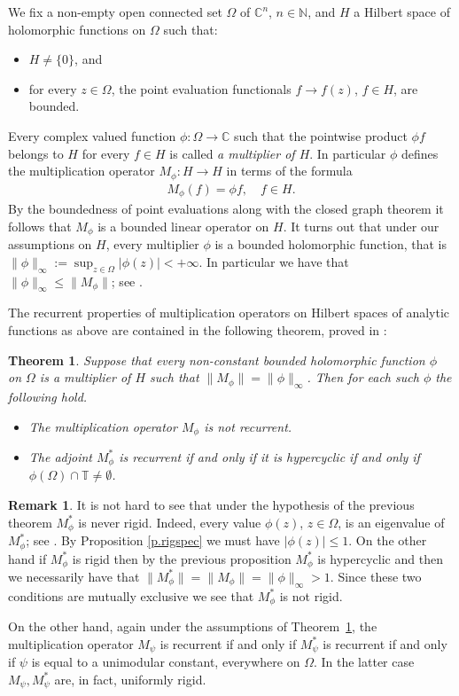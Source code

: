 \documentclass[12pt,leqno]{amsart}
\theoremstyle{plain}
\newtheorem{theorem}[equation]{Theorem}
\theoremstyle{definition}
\newtheorem{remark}[equation]{Remark}
\numberwithin{equation}{section}
\begin{document}
We fix a non-empty open connected set $\Omega$ of $\mathbb{C}^n$, $n\in \mathbb{N}$, and $H$ a Hilbert space of holomorphic functions on $\Omega $ such that: 
\begin{itemize}
	\item[-] $H\neq \{ 0\}$, and 
	\item [-]for every $z\in \Omega$, the point evaluation functionals $f\to f(z)$, $f\in H$, are bounded. 
\end{itemize}
Every complex valued function $\phi:\Omega \to \mathbb{C}$ such that the pointwise product $\phi f$ belongs to $H$ for every $f\in H$ is called \emph{a multiplier of $H$}. In particular $\phi$ defines the multiplication operator $M_{\phi}:H\to H$ in terms of the formula 
\begin{align*}
	M_{\phi }(f)=\phi f,\quad f\in H. 
\end{align*}
By the boundedness of point evaluations along with the closed graph theorem it follows that $M_{\phi}$ is a bounded linear operator on $H$. It turns out that under our assumptions on $H$, every multiplier $\phi $ is a bounded holomorphic function, that is $\| \phi \|_{\infty}:=\sup_{z\in \Omega }|\phi (z)|<+\infty $. In particular we have that $\| \phi \|_{\infty }\leq \| M_{\phi}\| $; see \cite{GoSh}.

The recurrent properties of multiplication operators on Hilbert spaces of analytic functions as above are contained in the following theorem, proved in \cite{CP}: 

\begin{theorem}\label{t.adjoints}
	Suppose that every non-constant bounded holomorphic function $\phi $ on $\Omega $ is a multiplier of $H$ such that $\| M_{\phi}\| =\| \phi \|_{\infty }$. Then for each such $\phi$ the following hold. 
	\begin{itemize}
		\item [(i)] The multiplication operator $M_\phi$ is not recurrent. 
		\item [(ii)] The adjoint $M_\phi ^*$ is recurrent if and only if it is hypercyclic if and only if $\phi(\Omega)\cap \mathbb T \neq \emptyset$. 
	\end{itemize}
\end{theorem}

\begin{remark} It is not hard to see that under the hypothesis of the previous theorem $M_\phi ^*$ is never rigid. Indeed, every value $\phi(z)$, $z\in \Omega$, is an eigenvalue of $M_\phi ^*$; see \cite{GoSh}. By Proposition \ref{p.rigspec} we must have $|\phi(z)|\leq 1$. On the other hand if $M_\phi ^*$ is rigid then by the previous proposition $M_\phi ^*$ is hypercyclic and then we necessarily have that $\|M_\phi ^*\|=\|M_\phi\|=\|\phi\|_\infty>1$. Since these two conditions are mutually exclusive we see that $M_\phi ^*$ is not rigid.

On the other hand, again under the assumptions of Theorem~\ref{t.adjoints}, the multiplication operator $M_{\psi }$ is recurrent if and only if $M_\psi ^*$ is recurrent if and only if $\psi$ is equal to a unimodular constant, everywhere on $\Omega$. In the latter case $M_{\psi}, M_\psi ^*$ are, in fact, uniformly rigid. 
\end{remark}
\end{document}

